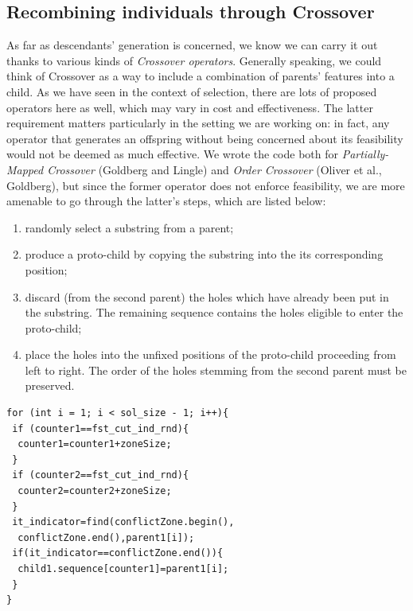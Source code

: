 \documentclass[letterpaper, 10 pt, conference]{ieeeconf}  %
\begin{document}
\subsection{Recombining individuals through Crossover}
As far as descendants' generation is concerned, we know we can carry it out thanks to various kinds of \textit{Crossover operators}. Generally speaking, we
could think of Crossover as a way to include a combination of parents' features into a child. As we have seen in the context of selection, there are lots of proposed operators here as well, which may vary in cost and
effectiveness. The latter requirement matters particularly in the setting we are working on: in fact, any operator that generates an offspring without being concerned about its feasibility would not be deemed as much effective.
We wrote the code both for \textit{Partially-Mapped Crossover} (Goldberg and Lingle) and \textit{Order Crossover} (Oliver et al., Goldberg), but since the former operator does not enforce feasibility, we are more amenable to go through the latter's steps, which are listed below:
\begin{enumerate}
\item randomly select a substring from a parent;
\item produce a proto-child by copying the substring into the
its corresponding position;
\item discard (from the second parent) the holes which have already been put in the substring. The remaining sequence contains the holes eligible to enter the proto-child;
\item place the holes into the unfixed positions of the proto-child proceeding from left to right. The order of the holes stemming from the second parent must be preserved.
\end{enumerate}


\begin{lstlisting}[caption={Order Crossover, in \texttt{TSPCrossover.cpp}}]
for (int i = 1; i < sol_size - 1; i++){
 if (counter1==fst_cut_ind_rnd){
  counter1=counter1+zoneSize;
 }
 if (counter2==fst_cut_ind_rnd){
  counter2=counter2+zoneSize;
 }
 it_indicator=find(conflictZone.begin(),
  conflictZone.end(),parent1[i]);
 if(it_indicator==conflictZone.end()){
  child1.sequence[counter1]=parent1[i]; 		                          
 }
}		
\end{lstlisting}
\end{document}
